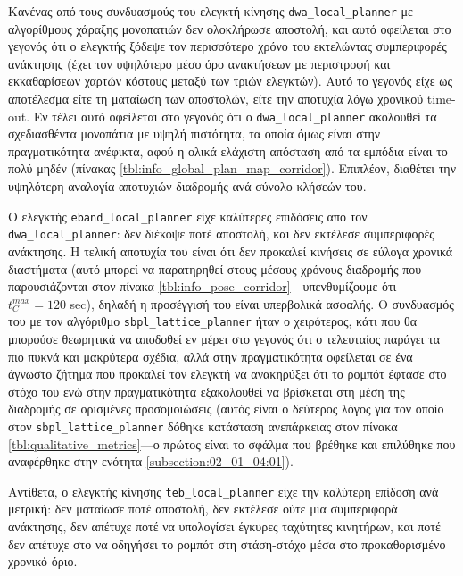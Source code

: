 Κανένας από τους συνδυασμούς του ελεγκτή κίνησης \texttt{dwa\_local\_planner}
με αλγορίθμους χάραξης μονοπατιών δεν ολοκλήρωσε αποστολή, και αυτό οφείλεται
στο γεγονός ότι ο ελεγκτής ξόδεψε τον περισσότερο χρόνο του εκτελώντας
συμπεριφορές ανάκτησης (έχει τον υψηλότερο μέσο όρο ανακτήσεων με περιστροφή
και εκκαθαρίσεων χαρτών κόστους μεταξύ των τριών ελεγκτών). Αυτό το γεγονός
είχε ως αποτέλεσμα είτε τη ματαίωση των αποστολών, είτε την αποτυχία λόγω
χρονικού time-out. Εν τέλει αυτό οφείλεται στο γεγονός ότι ο
\texttt{dwa\_local\_planner} ακολουθεί τα σχεδιασθέντα μονοπάτια με υψηλή
πιστότητα, τα οποία όμως είναι στην πραγματικότητα ανέφικτα, αφού η ολικά
ελάχιστη απόσταση από τα εμπόδια είναι το πολύ μηδέν (πίνακας
\ref{tbl:info_global_plan_map_corridor}). Επιπλέον, διαθέτει την υψηλότερη
αναλογία αποτυχιών διαδρομής ανά σύνολο κλήσεών του.

Ο ελεγκτής \texttt{eband\_local\_planner} είχε καλύτερες επιδόσεις από τον
\texttt{dwa\_local\_planner}: δεν διέκοψε ποτέ αποστολή, και δεν εκτέλεσε
συμπεριφορές ανάκτησης. Η τελική αποτυχία του είναι ότι δεν προκαλεί
κινήσεις σε εύλογα χρονικά διαστήματα (αυτό μπορεί να παρατηρηθεί στους μέσους
χρόνους διαδρομής που παρουσιάζονται στον πίνακα
\ref{tbl:info_pose_corridor}---υπενθυμίζουμε ότι $t_C^{max} = 120$ sec), δηλαδή
η προσέγγισή του είναι υπερβολικά ασφαλής. Ο συνδυασμός του με τον αλγόριθμο
\texttt{sbpl\_lattice\_planner} ήταν ο χειρότερος, κάτι που θα μπορούσε
θεωρητικά να αποδοθεί εν μέρει στο γεγονός ότι ο τελευταίος παράγει τα πιο
πυκνά και μακρύτερα σχέδια, αλλά στην πραγματικότητα οφείλεται σε ένα
άγνωστο ζήτημα που προκαλεί τον ελεγκτή να ανακηρύξει ότι το ρομπότ έφτασε στο
στόχο του ενώ στην πραγματικότητα εξακολουθεί να βρίσκεται στη μέση της
διαδρομής σε ορισμένες προσομοιώσεις (αυτός είναι ο δεύτερος λόγος για τον
οποίο στον \texttt{sbpl\_lattice\_planner} δόθηκε κατάσταση ανεπάρκειας στον
πίνακα \ref{tbl:qualitative_metrics}---ο πρώτος είναι το σφάλμα που βρέθηκε και
επιλύθηκε που αναφέρθηκε στην ενότητα \ref{subsection:02_01_04:01}).

Αντίθετα, ο ελεγκτής κίνησης \texttt{teb\_local\_planner} είχε την καλύτερη
επίδοση ανά μετρική: δεν ματαίωσε ποτέ αποστολή, δεν εκτέλεσε ούτε μία
συμπεριφορά ανάκτησης, δεν απέτυχε ποτέ να υπολογίσει έγκυρες ταχύτητες
κινητήρων, και ποτέ δεν απέτυχε στο να οδηγήσει το ρομπότ στη στάση-στόχο μέσα
στο προκαθορισμένο χρονικό όριο.

